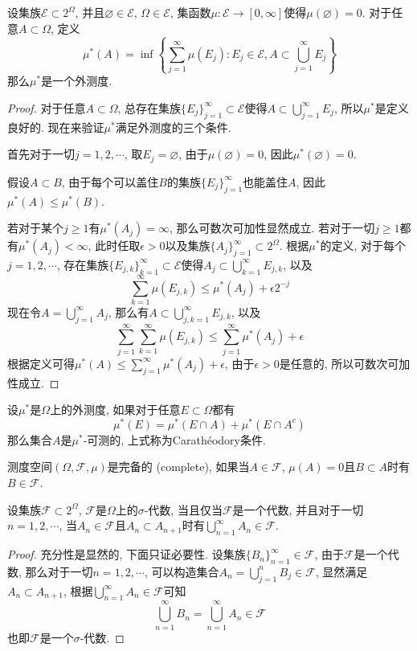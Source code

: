 \documentclass[cn, 12pt, math=mtpro2, bibstyle=apa, blue, twocol]{elegantbook}
\newcommand{\F}{\mathcal{F}}
\let\emptyset\varnothing
\begin{document}
\begin{theorem}\label{thm:thm1.14}
设集族$\mathcal{E} \subset 2^\Omega$, 并且$\emptyset\in\mathcal{E}$, $\Omega\in\mathcal{E}$, 集函数$\mu:\mathcal{E} \to[0,\infty]$使得$\mu(\emptyset)=0$. 对于任意$A\subset\Omega$, 定义
$$\mu^\ast(A)=\inf\left\{\sum_{j=1}^{\infty}\mu(E_j): E_j\in\mathcal{E}, A\subset \bigcup_{j=1}^\infty E_j\right\}$$
那么$\mu^\ast$是一个外测度.
\end{theorem}
\begin{proof}
  对于任意$A\subset\Omega$, 总存在集族$\{E_j\}_{j=1}^\infty\subset\mathcal{E}$使得$A\subset\bigcup_{j=1}^\infty E_j$, 所以$\mu^\ast$是定义良好的. 现在来验证$\mu^\ast$满足外测度的三个条件.

  首先对于一切$j=1,2,\cdots$, 取$E_j=\emptyset$, 由于$\mu(\emptyset)=0$, 因此$\mu^\ast(\emptyset)=0$.

  假设$A\subset B$, 由于每个可以盖住$B$的集族$\{E_j\}_{j=1}^\infty$也能盖住$A$, 因此$\mu^\ast(A)\leq\mu^\ast(B)$.

  若对于某个$j\ge1$有$\mu^\ast(A_j)=\infty$, 那么可数次可加性显然成立. 若对于一切$j\ge1$都有$\mu^\ast(A_j)<\infty$, 此时任取$\epsilon>0$以及集族$\{A_j\}_{j=1}^\infty\subset 2^\Omega$. 根据$\mu^\ast$的定义, 对于每个$j=1,2,\cdots$, 存在集族$\{E_{j,k}\}_{k=1}^\infty\subset\mathcal{E}$使得$A_j\subset\bigcup_{k=1}^\infty E_{j,k}$, 以及
  $$\sum_{k=1}^{\infty}\mu(E_{j,k})\leq \mu^\ast(A_j)+\epsilon 2^{-j}$$
  现在令$A=\bigcup_{j=1}^\infty A_j$, 那么有$A\subset\bigcup_{j,k=1}^\infty E_{j,k}$, 以及
  $$\sum_{j=1}^{\infty}\sum_{k=1}^{\infty}\mu(E_{j,k})\leq\sum_{j=1}^{\infty}\mu^\ast(A_j)+\epsilon$$
  根据定义可得$\mu^\ast(A)\leq\sum_{j=1}^{\infty}\mu^\ast(A_j)+\epsilon$, 由于$\epsilon>0$是任意的, 所以可数次可加性成立.
\end{proof}

\begin{definition}
设$\mu^\ast$是$\Omega$上的外测度, 如果对于任意$E\subset\Omega$都有
$$\mu^\ast(E)=\mu^\ast(E\cap A)+\mu^\ast(E\cap A^c)$$
那么集合$A$是$\mu^\ast$-可测的, 上式称为Carathéodory条件.
\end{definition}
\begin{definition}
测度空间$(\Omega,\F,\mu)$是完备的 (complete), 如果当$A\in\F$, $\mu(A)=0$且$B\subset A$时有$B\in\F$.
\end{definition}
\begin{lemma}\label{lem:lem1.5}
设集族$\F\subset2^\Omega$, $\F$是$\Omega$上的$\sigma$-代数, 当且仅当$\F$是一个代数, 并且对于一切$n=1,2,\cdots$, 当$A_n\in\F$且$A_n\subset A_{n+1}$时有$\bigcup_{n=1}^\infty A_n\in\F$.
\end{lemma}
\begin{proof}
  充分性是显然的, 下面只证必要性. 设集族$\{B_n\}_{n=1}^\infty\in\F$, 由于$\F$是一个代数, 那么对于一切$n=1,2,\cdots$, 可以构造集合$A_n=\bigcup_{j=1}^nB_j\in\F$, 显然满足$A_n\subset A_{n+1}$, 根据$\bigcup_{n=1}^\infty A_n\in\F$可知
  $$\bigcup_{n=1}^\infty B_n=\bigcup_{n=1}^\infty A_n\in\F$$
  也即$\F$是一个$\sigma$-代数.
\end{proof}
\end{document}
